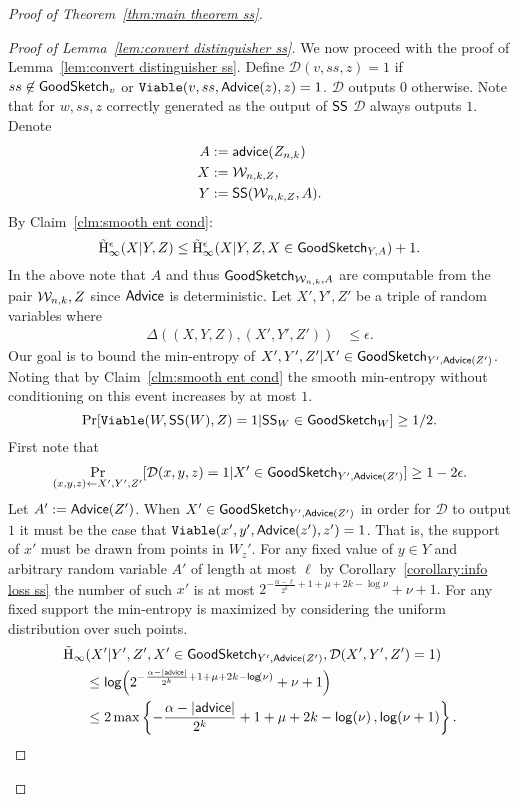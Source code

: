 \begin{proof}[Proof of Theorem~\ref{thm:main theorem ss}]
\begin{proof}[Proof of Lemma~\ref{lem:convert distinguisher ss}]
We now proceed with the proof of Lemma~\ref{lem:convert distinguisher ss}. Define $\mathcal{D}(v, ss, z) =1$ if $ss\not\in\mathsf{GoodSketch}_v$ or $\mathtt{Viable}(v, ss, {\mathsf{Advice}}(z), z) =1$.  $\mathcal{D}$ outputs $0$ otherwise.  Note that for $w, ss, z$ correctly generated as the output of ${\mathsf{SS}}$ $\mathcal{D}$ always outputs $1$. Denote 
\begin{align*}
A&:= {\mathsf{advice}}(Z_{n,k})\\
X&:=\mathcal{W}_{n,k, Z},\\
Y&:={\mathsf{SS}}(\mathcal{W}_{n,k, Z}, A).
\end{align*}
 By Claim~\ref{clm:smooth ent cond}:
\[
\tilde{\mathrm{H}}_\infty^\epsilon(X| Y, Z) \le \tilde{\mathrm{H}}_\infty^\epsilon(X| Y,Z, X \in \mathsf{GoodSketch}_{Y, A}) +1.
\]
In the above note that $A$ and thus $\mathsf{GoodSketch}_{\mathcal{W}_{n,k}, A}$ are computable from the pair $\mathcal{W}_{n,k}, Z$ since ${\mathsf{Advice}}$ is deterministic. 
Let $X', Y', Z'$ be a triple of random variables where 
\begin{align*}
\Delta((X, Y, Z), (X', Y', Z')) &\le \epsilon.
\end{align*} Our goal is to bound the min-entropy of $X', Y', Z' | X'\in\mathsf{GoodSketch}_{Y', {\mathsf{Advice}}(Z')}$. Noting that by Claim~\ref{clm:smooth ent cond} the smooth min-entropy without conditioning on this event increases by at most $1$.
\[
\Pr[\mathtt{Viable}(W, {\mathsf{SS}}(W), Z) = 1| {\mathsf{SS}}_W \in \mathsf{GoodSketch}_W] \ge 1/2.
\]
First note that \[\Pr_{(x, y, z) \leftarrow X', Y', Z' }[\mathcal{D}(x,y,z)=1| X'\in\mathsf{GoodSketch}_{Y', {\mathsf{Advice}}(Z')}]\ge 1-2\epsilon.\]
Let $A':= {\mathsf{Advice}}(Z')$.  When $X'\in\mathsf{GoodSketch}_{Y', {\mathsf{Advice}}(Z')}$ in order for $\mathcal{D}$ to output $1$ it must be the case that $\mathtt{Viable}(x', y', {\mathsf{Advice}}(z'), z') =1$. That is, the support of $x'$ must be drawn from points in $W_z'$.  For any fixed value of $y\in Y$ and arbitrary random variable $A'$ of length at most $\ell$ by Corollary~\ref{corollary:info loss ss} the number of such $x'$ is at most $2^{-\frac{\alpha-\ell}{2^k}+1+\mu+2k-\log{\nu}}+\nu+1.$ For any fixed support the min-entropy is maximized by considering the uniform distribution over such points. \begin{align*}
\tilde{\mathrm{H}}_\infty&(X'|Y' ,Z', X'\in\mathsf{GoodSketch}_{Y', {\mathsf{Advice}}(Z')}, \mathcal{D}(X', Y', Z')=1)\\ &\le \mathsf{log}\!\left(2^{-\frac{\alpha-|{\mathsf{advice}}|}{2^k}+1+\mu+2k-\mathsf{log}\!\left(\nu\right)}+\nu+1\right)\\
&\le 2\max\left\{-\frac{\alpha-|{\mathsf{advice}}|}{2^k}+1+\mu+2k-\mathsf{log}\!\left(\nu\right), \mathsf{log}\!\left(\nu+1\right)\right\}.
\end{align*}


\end{proof}
\end{proof}
